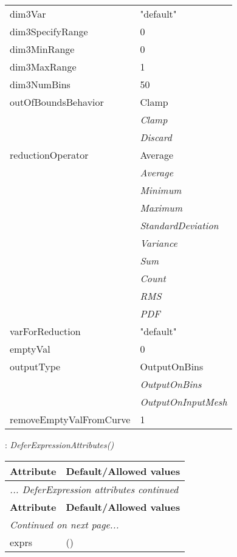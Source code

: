 \documentclass[10pt,a4paper]{report}
\begin{document}
\begin{longtable}{ll}
dim3Var  &  "default" \\
dim3SpecifyRange  &  0 \\
dim3MinRange  &  0 \\
dim3MaxRange  &  1 \\
dim3NumBins  &  50 \\
outOfBoundsBehavior  &  Clamp   \\
 & {\it  Clamp} \\
 & {\it  Discard} \\
reductionOperator  &  Average   \\
 & {\it  Average} \\
 & {\it  Minimum} \\
 & {\it  Maximum} \\
 & {\it  StandardDeviation} \\
 & {\it  Variance} \\
 & {\it  Sum} \\
 & {\it  Count} \\
 & {\it  RMS} \\
 & {\it  PDF} \\
varForReduction  &  "default" \\
emptyVal  &  0 \\
outputType  &  OutputOnBins   \\
 & {\it  OutputOnBins} \\
 & {\it  OutputOnInputMesh} \\
removeEmptyValFromCurve  &  1 \\
\end{longtable}

\newpage

{}
: {\it DeferExpressionAttributes() }\\[-3mm]

\begin{longtable}{ll}
{\bf Attribute} & {\bf Default/Allowed values} \\
\hline \hline
\endfirsthead
\multicolumn{2}{l}{{\it ... DeferExpression attributes continued}} \\
{\bf Attribute} & {\bf Default/Allowed values} \\
\hline \hline
\endhead
\hline
\multicolumn{2}{l}{{\it Continued on next page...}} \\
\endfoot
\hline
\endlastfoot

exprs  &  () \\
\end{longtable}
\end{document}

